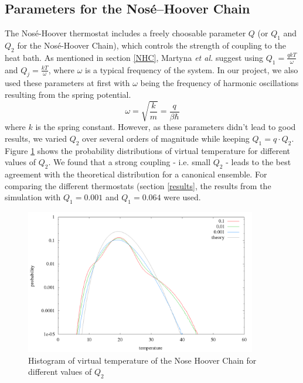 \subsection{Parameters for the Nosé--Hoover Chain}
The Nosé-Hoover thermostat includes a freely choosable parameter $Q$ (or $Q_1$ and $Q_2$ for the Nosé-Hoover Chain), which controls the strength of coupling to the heat bath. As mentioned in section \ref{NHC}, Martyna \textit{et al.} \cite{Martyna1992} suggest using $Q_1 = \frac{qkT}{\omega}$ and $Q_j = \frac{kT}{\omega}$, where $\omega$ is a typical frequency of the system. In our project, we also used these parameters at first with $\omega$ being the frequency of harmonic oscillations resulting from the spring potential.
\begin{equation}
\omega = \sqrt{\frac{k}{m}} = \frac{q}{\beta \hbar}
\end{equation} 
where $k$ is the spring constant. However, as these parameters didn't lead to good results, we varied $Q_2$ over several orders of magnitude while keeping $Q_1 = q\cdot Q_2$. Figure \ref{im:temp_chain} shows the probability distributions of virtual temperature for different values of $Q_2$. We found that a strong coupling - i.e. small $Q_2$ - leads to the best agreement with the theoretical distribution for a canonical ensemble. For comparing the different thermostats (section \ref{results}, the results from the simulation with $Q_1 = 0.001$ and $Q_1 = 0.064$ were used. 

\begin{figure}[H]
\centering
\includegraphics[width=0.9\textwidth]{./graphics/Histogramm_tempCol_one_Chain.png}
\caption{Histogram of virtual temperature of the Nose Hoover Chain for different values of $Q_2$ }
\label{im:temp_chain}
\end{figure}



